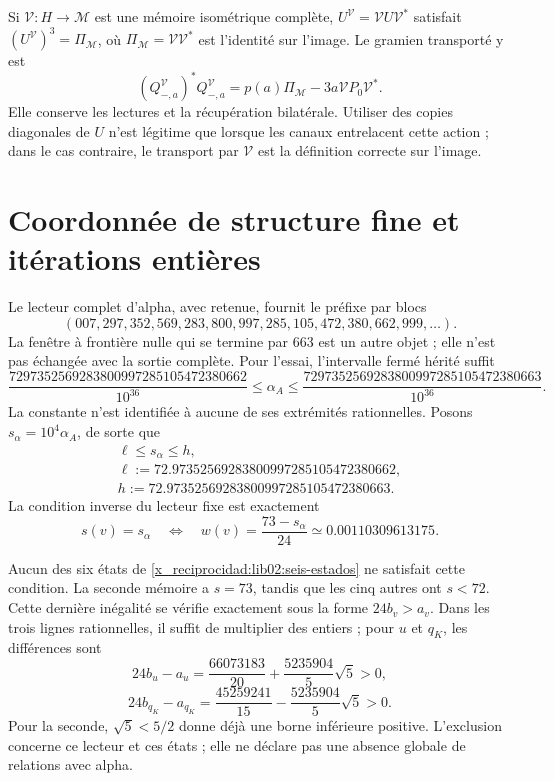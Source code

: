 Si \(\mathcal V:H\to\mathcal M\) est une mémoire isométrique
complète, \(U^{\mathcal V}=\mathcal VU\mathcal V^*\) satisfait
\((U^{\mathcal V})^3=\Pi_{\mathcal M}\), où
\(\Pi_{\mathcal M}=\mathcal V\mathcal V^*\) est l’identité sur
l’image. Le gramien transporté y est
\[
 (Q_{-,a}^{\mathcal V})^*Q_{-,a}^{\mathcal V}
 =p(a)\Pi_{\mathcal M}-3a\mathcal VP_0\mathcal V^*.
\]
Elle conserve les lectures et la récupération bilatérale. Utiliser des copies diagonales de \(U\) n'est légitime que lorsque les canaux entrelacent cette action ; dans le cas contraire, le transport par \(\mathcal V\) est la définition correcte sur l'image.

\section{Coordonnée de structure fine et itérations entières}
\label{x_reciprocidad:lib02:ensayo-inverso}

Le lecteur complet d’alpha, avec retenue, fournit le préfixe par
blocs
\[
 (007,297,352,569,283,800,997,285,105,472,380,662,999,\ldots).
\]
La fenêtre à frontière nulle qui se termine par 663 est un autre objet ; elle n’est pas
échangée avec la sortie complète. Pour l’essai, l’intervalle
fermé hérité suffit
\begin{equation}
 \frac{7297352569283800997285105472380662}{10^{36}}
 \leq\alpha_A\leq
 \frac{7297352569283800997285105472380663}{10^{36}}.
 \label{x_reciprocidad:lib02:intervalo-alpha}
\end{equation}
La constante n'est identifiée à aucune de ses extrémités rationnelles. Posons \(s_\alpha=10^4\alpha_A\), de sorte que
\begin{equation}
 \begin{gathered}
 \ell\leq s_\alpha\leq h,\\
 \ell:=72.97352569283800997285105472380662,\\
 h:=72.97352569283800997285105472380663.
 \end{gathered}
 \label{x_reciprocidad:lib02:intervalo-s}
\end{equation}
La condition inverse du lecteur fixe est exactement
\begin{equation}
 s(v)=s_\alpha
 \quad\Longleftrightarrow\quad
 w(v)=\frac{73-s_\alpha}{24}
 \simeq0.00110309613175.
 \label{x_reciprocidad:lib02:criterio-alpha}
\end{equation}

Aucun des six états de \cref{x_reciprocidad:lib02:seis-estados} ne satisfait cette
condition. La seconde mémoire a \(s=73\), tandis que les cinq autres
ont \(s<72\). Cette dernière inégalité se vérifie exactement
sous la forme \(24b_v>a_v\). Dans les trois lignes rationnelles, il suffit de multiplier des
entiers ; pour \(u\) et \(q_K\), les différences sont
\[
 24b_u-a_u=\frac{66073183}{20}+\frac{5235904}{5}\sqrt5>0,
\]
\[
 24b_{q_K}-a_{q_K}
 =\frac{45259241}{15}-\frac{5235904}{5}\sqrt5>0.
\]
Pour la seconde, \(\sqrt5<5/2\) donne déjà une borne inférieure positive. L'exclusion concerne ce lecteur et ces états ; elle ne déclare pas une absence globale de relations avec alpha.


